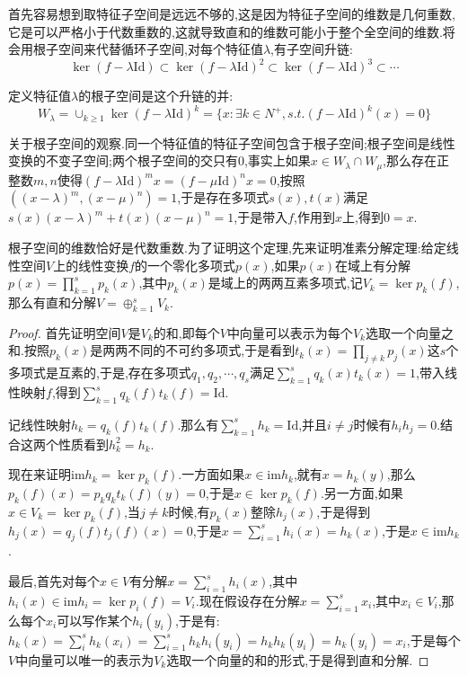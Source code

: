 首先容易想到取特征子空间是远远不够的,这是因为特征子空间的维数是几何重数,它是可以严格小于代数重数的,这就导致直和的维数可能小于整个全空间的维数.将会用根子空间来代替循环子空间,对每个特征值$\lambda$,有子空间升链:
$$\ker(f-\lambda\mathrm{Id})\subset\ker(f-\lambda \mathrm{Id})^2\subset\ker(f-\lambda\mathrm{Id})^3\subset\cdots$$

定义特征值$\lambda$的根子空间是这个升链的并:
$$W_{\lambda}=\cup_{k\ge1}\ker(f-\lambda\mathrm{Id})^k=\{x:\exists k\in N^+,s.t. (f-\lambda\mathrm{Id})^k(x)=0\}$$

关于根子空间的观察.同一个特征值的特征子空间包含于根子空间;根子空间是线性变换的不变子空间;两个根子空间的交只有0,事实上如果$x\in W_{\lambda}\cap W_{\mu}$,那么存在正整数$m,n$使得$(f-\lambda\mathrm{Id})^mx=(f-\mu\mathrm{Id})^nx=0$,按照$((x-\lambda)^m,(x-\mu)^n)=1$,于是存在多项式$s(x),t(x)$满足$s(x)(x-\lambda)^m+t(x)(x-\mu)^n=1$,于是带入$f$,作用到$x$上,得到$0=x$.

根子空间的维数恰好是代数重数.为了证明这个定理,先来证明准素分解定理:给定线性空间$V$上的线性变换$f$的一个零化多项式$p(x)$,如果$p(x)$在域上有分解$p(x)=\prod_{k=1}^sp_k(x)$,其中$p_k(x)$是域上的两两互素多项式,记$V_k=\ker p_k(f)$,那么有直和分解$V=\oplus_{k=1}^sV_k$.

\begin{proof}
	
	首先证明空间$V$是$V_k$的和,即每个$V$中向量可以表示为每个$V_k$选取一个向量之和.按照$p_k(x)$是两两不同的不可约多项式,于是看到$t_k(x)=\prod_{j\not=k}p_j(x)$这$s$个多项式是互素的,于是,存在多项式$q_1,q_2,\cdots,q_s$满足$\sum_{k=1}^{s}q_k(x)t_k(x)=1$,带入线性映射$f$,得到$\sum_{k=1}^{s}q_k(f)t_k(f)=\mathrm{Id}$.
	
	记线性映射$h_k=q_k(f)t_k(f)$.那么有$\sum_{k=1}^{s}h_k=\mathrm{Id}$,并且$i\not=j$时候有$h_ih_j=0$.结合这两个性质看到$h_k^2=h_k$.
	
	现在来证明$\mathrm{im}h_k=\ker p_k(f)$.一方面如果$x\in\mathrm{im}h_k$,就有$x=h_k(y)$,那么$p_k(f)(x)=p_kq_kt_k(f)(y)=0$,于是$x\in\ker p_k(f)$.另一方面,如果$x\in V_k=\ker p_k(f)$,当$j\not=k$时候,有$p_k(x)$整除$h_j(x)$,于是得到$h_j(x)=q_j(f)t_j(f)(x)=0$,于是$x=\sum_{i=1}^{s}h_i(x)=h_k(x)$,于是$x\in\mathrm{im}h_k$.
	
	最后,首先对每个$x\in V$有分解$x=\sum_{i=1}^{s}h_i(x)$,其中$h_i(x)\in\mathrm{im}h_i=\ker p_i(f)=V_i$.现在假设存在分解$x=\sum_{i=1}^{s}x_i$,其中$x_i\in V_i$,那么每个$x_i$可以写作某个$h_i(y_i)$,于是有:$h_k(x)=\sum_{i}^{s}h_k(x_i)=\sum_{i=1}^{s}h_kh_i(y_i)=h_kh_k(y_i)=h_k(y_i)=x_i$,于是每个$V$中向量可以唯一的表示为$V_k$选取一个向量的和的形式,于是得到直和分解.
	
\end{proof}

